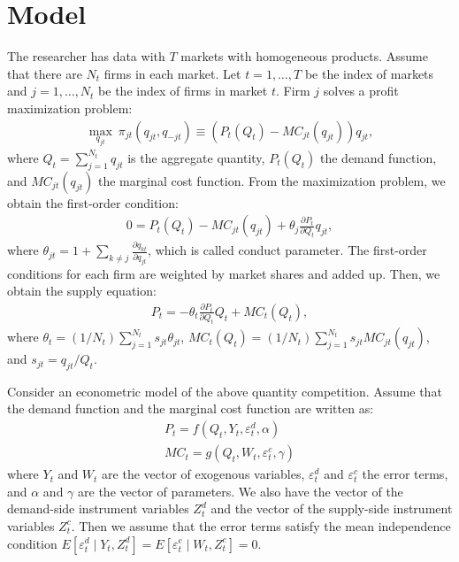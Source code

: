 \documentclass[11pt, a4paper]{article}
\begin{document}
\section{Model}
The researcher has data with $T$ markets with homogeneous products.
Assume that there are $N_t$ firms in each market.
Let $t = 1,\ldots, T$ be the index of markets and $j = 1, \ldots, N_t$ be the index of firms in market $t$.
Firm $j$ solves a profit maximization problem:
\begin{align*}
    \max_{q_{jt}} \ \pi_{jt}(q_{jt}, q_{-jt}) \equiv (P_t(Q_{t}) - MC_{jt}(q_{jt}))q_{jt},\nonumber
\end{align*}
where $Q_t = \sum_{j = 1}^{N_t} q_{jt}$ is the aggregate quantity, $P_t(Q_{t})$ the demand function, and $MC_{jt}(q_{jt})$ the marginal cost function.
From the maximization problem, we obtain the first-order condition:
\begin{align*}
    0 = P_t(Q_{t}) - MC_{jt}(q_{jt}) + \theta_j \frac{\partial P_t}{\partial Q_t}q_{jt},\nonumber
\end{align*}
where $\theta_{jt} = 1 + \sum_{k\ne j}\frac{\partial q_{kt}}{\partial q_{jt}}$, which is called conduct parameter.
The first-order conditions for each firm are weighted by market shares and added up. 
Then, we obtain the supply equation:
\begin{align}
     P_t = -\theta_{t}\frac{\partial P_t}{\partial Q_t}Q_t + MC_t(Q_t),\label{eq:supply_equation}
\end{align}
where $\theta_t = (1/N_t)\sum_{j = 1}^{N_t} s_{jt}\theta_{jt}$, $MC_t(Q_t) = (1/N_t)\sum_{j = 1}^{N_t} s_{jt} MC_{jt}(q_{jt})$, and $s_{jt} = q_{jt}/Q_{t}$.

Consider an econometric model of the above quantity competition.
Assume that the demand function and the marginal cost function are written as: 
\begin{align}
    P_t = f(Q_t, Y_t, \varepsilon^{d}_{t}, \alpha) \label{eq:demand}\\
    MC_t = g(Q_t, W_{t}, \varepsilon^{c}_{t}, \gamma)\label{eq:marginal_cost}
\end{align}
where $Y_t$ and $W_{t}$ are the vector of exogenous variables, $\varepsilon^{d}_{t}$ and $\varepsilon^{c}_{t}$ the error terms, and $\alpha$ and $\gamma$ are the vector of parameters.
We also have the vector of the demand-side instrument variables $Z^{d}_{t}$ and the vector of the supply-side instrument variables $Z^{c}_{t}$.
Then we assume that the error terms satisfy the mean independence condition $E[\varepsilon^{d}_{t}\mid Y_t, Z^{d}_{t}] = E[\varepsilon^{c}_{t} \mid W_{t}, Z^{c}_{t}] =0$.
\end{document}
